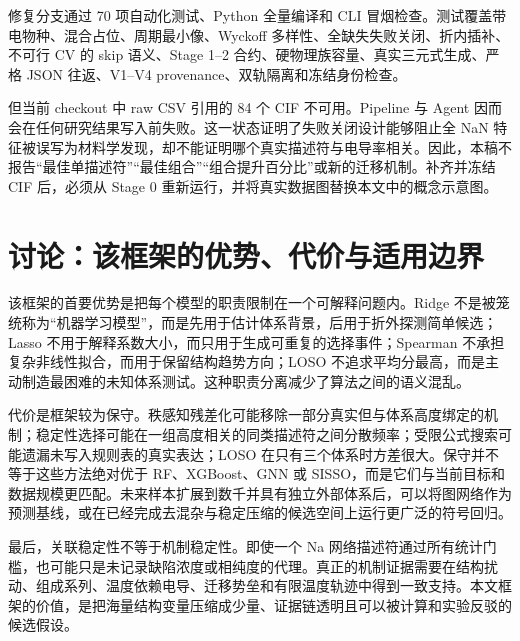 修复分支通过 70 项自动化测试、Python 全量编译和 CLI 冒烟检查。测试覆盖带电物种、混合占位、周期最小像、Wyckoff 多样性、全缺失失败关闭、折内插补、不可行 CV 的 skip 语义、Stage 1--2 合约、硬物理族容量、真实三元式生成、严格 JSON 往返、V1--V4 provenance、双轨隔离和冻结身份检查。

但当前 checkout 中 raw CSV 引用的 84 个 CIF 不可用。Pipeline 与 Agent 因而会在任何研究结果写入前失败。这一状态证明了失败关闭设计能够阻止全 NaN 特征被误写为材料学发现，却不能证明哪个真实描述符与电导率相关。因此，本稿不报告“最佳单描述符”“最佳组合”“组合提升百分比”或新的迁移机制。补齐并冻结 CIF 后，必须从 Stage 0 重新运行，并将真实数据图替换本文中的概念示意图。

\section{讨论：该框架的优势、代价与适用边界}

该框架的首要优势是把每个模型的职责限制在一个可解释问题内。Ridge 不是被笼统称为“机器学习模型”，而是先用于估计体系背景，后用于折外探测简单候选；Lasso 不用于解释系数大小，而只用于生成可重复的选择事件；Spearman 不承担复杂非线性拟合，而用于保留结构趋势方向；LOSO 不追求平均分最高，而是主动制造最困难的未知体系测试。这种职责分离减少了算法之间的语义混乱。

代价是框架较为保守。秩感知残差化可能移除一部分真实但与体系高度绑定的机制；稳定性选择可能在一组高度相关的同类描述符之间分散频率；受限公式搜索可能遗漏未写入规则表的真实表达；LOSO 在只有三个体系时方差很大。保守并不等于这些方法绝对优于 RF、XGBoost、GNN 或 SISSO，而是它们与当前目标和数据规模更匹配。未来样本扩展到数千并具有独立外部体系后，可以将图网络作为预测基线，或在已经完成去混杂与稳定压缩的候选空间上运行更广泛的符号回归。

最后，关联稳定性不等于机制稳定性。即使一个 Na 网络描述符通过所有统计门槛，也可能只是未记录缺陷浓度或相纯度的代理。真正的机制证据需要在结构扰动、组成系列、温度依赖电导、迁移势垒和有限温度轨迹中得到一致支持。本文框架的价值，是把海量结构变量压缩成少量、证据链透明且可以被计算和实验反驳的候选假设。
